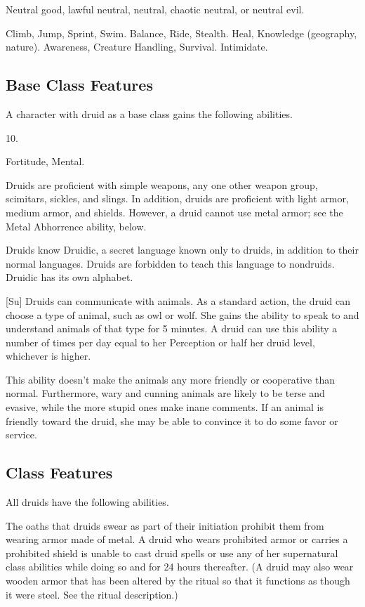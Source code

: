 Neutral good, lawful neutral, neutral, chaotic neutral, or neutral evil.

 Climb, Jump, Sprint, Swim.
 Balance, Ride, Stealth.
 Heal, Knowledge (geography, nature).
 Awareness, Creature Handling, Survival.
 Intimidate.

\subsection{Base Class Features}
A character with druid as a base class gains the following abilities.

 10.

  Fortitude,  Mental.

Druids are proficient with simple weapons, any one other weapon group, scimitars, sickles, and slings.
In addition, druids are proficient with light armor, medium armor, and shields.
However, a druid cannot use metal armor; see the Metal Abhorrence ability, below.

Druids know Druidic, a secret language known only to druids, in addition to their normal languages.
Druids are forbidden to teach this language to nondruids.
Druidic has its own alphabet.

[Su]
Druids can communicate with animals.
As a standard action, the druid can choose a type of animal, such as owl or wolf.
She gains the ability to speak to and understand animals of that type for 5 minutes.
A druid can use this ability a number of times per day equal to her Perception or half her druid level, whichever is higher.

This ability doesn't make the animals any more friendly or cooperative than normal.
Furthermore, wary and cunning animals are likely to be terse and evasive, while the more stupid ones make inane comments.
If an animal is friendly toward the druid, she may be able to convince it to do some favor or service.

\subsection{Class Features}
All druids have the following abilities.

The oaths that druids swear as part of their initiation prohibit them from wearing armor made of metal.
A druid who wears prohibited armor or carries a prohibited shield is unable to cast druid spells or use any of her supernatural class abilities while doing so and for 24 hours thereafter.
(A druid may also wear wooden armor that has been altered by the  ritual so that it functions as though it were steel. See the ritual description.)

